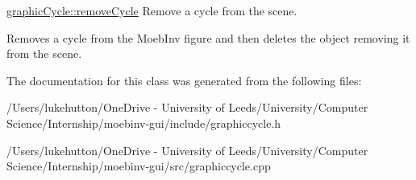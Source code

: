 \mbox{\hyperlink{classgraphic_cycle_aba3c23f4bce3028b9f4582dc2e145e1e}{graphic\+Cycle\+::remove\+Cycle}} Remove a cycle from the scene. 

Removes a cycle from the Moeb\+Inv figure and then deletes the object removing it from the scene. 

The documentation for this class was generated from the following files\+:\begin{DoxyCompactItemize}
\item 
/\+Users/lukehutton/\+One\+Drive -\/ University of Leeds/\+University/\+Computer Science/\+Internship/moebinv-\/gui/include/graphiccycle.\+h\item 
/\+Users/lukehutton/\+One\+Drive -\/ University of Leeds/\+University/\+Computer Science/\+Internship/moebinv-\/gui/src/graphiccycle.\+cpp\end{DoxyCompactItemize}
